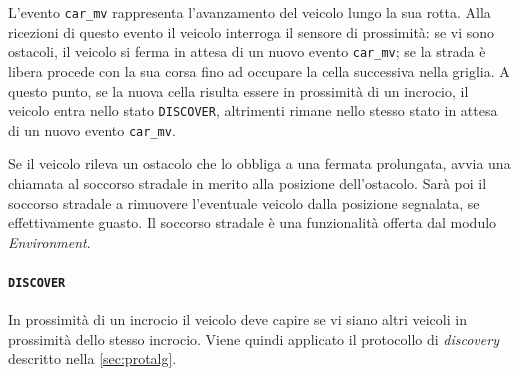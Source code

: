 \documentclass{memoir}
\begin{document}
\begin{figure}[h]
  \centering
\end{figure}

L'evento \texttt{car\_mv} rappresenta l'avanzamento del veicolo lungo la sua
rotta. Alla ricezioni di questo evento il veicolo interroga il sensore di
prossimità: se vi sono ostacoli, il veicolo si ferma in attesa di un nuovo
evento \texttt{car\_mv}; se la strada è libera procede con la sua corsa fino ad
occupare la cella successiva nella griglia. A questo punto, se la nuova cella
risulta essere in prossimità di un incrocio, il veicolo entra nello stato
\texttt{DISCOVER}, altrimenti rimane nello stesso stato in attesa di un nuovo
evento \texttt{car\_mv}.

Se il veicolo rileva un ostacolo che lo obbliga a una fermata prolungata, avvia
una chiamata al soccorso stradale in merito alla posizione dell'ostacolo. Sarà
poi il soccorso stradale a rimuovere l'eventuale veicolo dalla posizione
segnalata, se effettivamente guasto. Il soccorso stradale è una funzionalità
offerta dal modulo \emph{Environment}.

\paragraph{\texttt{DISCOVER}}
In prossimità di un incrocio il veicolo deve capire se vi siano altri veicoli in
prossimità dello stesso incrocio. Viene quindi applicato il protocollo di
\emph{discovery} descritto nella \cref{sec:protalg}.
\end{document}
